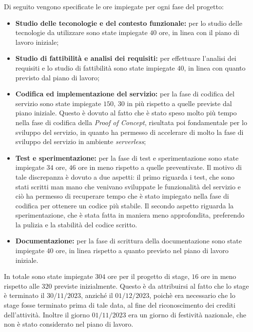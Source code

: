 Di seguito vengono specificate le ore impiegate per ogni fase del progetto:
\begin{itemize}
    \item \textbf{Studio delle teconologie e del contesto funzionale:} per lo
          studio delle tecnologie da utilizzare sono state impiegate $40$ ore, in
          linea con il piano di lavoro iniziale;
    \item \textbf{Studio di fattibilità e analisi dei requisiti:} per effettuare
          l'analisi dei requisiti e lo studio di fattibilità sono state impiegate
          $40$, in linea con quanto previsto dal piano di lavoro;
    \item \textbf{Codifica ed implementazione del servizio:} per la fase di
          codifica del servizio sono state impiegate $150$, $30$ in più rispetto a
          quelle previste dal piano iniziale. Questo è dovuto al fatto che è stato
          speso molto più tempo nella fase di codifica della \emph{Proof of Concept},
          risultata poi fondamentale per lo sviluppo del servizio, in quanto ha
          permesso di accelerare di molto la fase di sviluppo del servizio in ambiente
          \emph{serverless};
    \item \textbf{Test e sperimentazione:} per la fase di test e sperimentazione
          sono state impiegate $34$ ore, $46$ ore in meno rispetto a quelle
          preventivate. Il motivo di tale discrepanza è dovuto a due aspetti: il primo
          riguarda i test, che sono stati scritti man mano che venivano sviluppate le
          funzionalità del servizio e ciò ha permesso di recuperare tempo che è stato
          impiegato nella fase di codifica per ottenere un codice più stabile. Il
          secondo aspetto riguarda la sperimentazione, che è stata fatta in maniera
          meno approfondita, preferendo la pulizia e la stabilità del codice scritto.
    \item \textbf{Documentazione:} per la fase di scrittura della documentazione
          sono state impiegate $40$ ore, in linea rispetto a quanto previsto nel piano
          di lavoro iniziale.
\end{itemize}

In totale sono state impiegate $304$ ore per il progetto di stage, $16$ ore in
meno rispetto alle $320$ previste inizialmente. Questo è da attribuirsi al fatto
che lo stage è terminato il $30/11/2023$, anziché il $01/12/2023$, poichè era
necessario che lo stage fosse terminato prima di tale data, al fine del
riconoscimento dei crediti dell'attività. Inoltre il giorno $01/11/2023$ era un
giorno di festività nazionale, che non è stato considerato nel piano di lavoro.